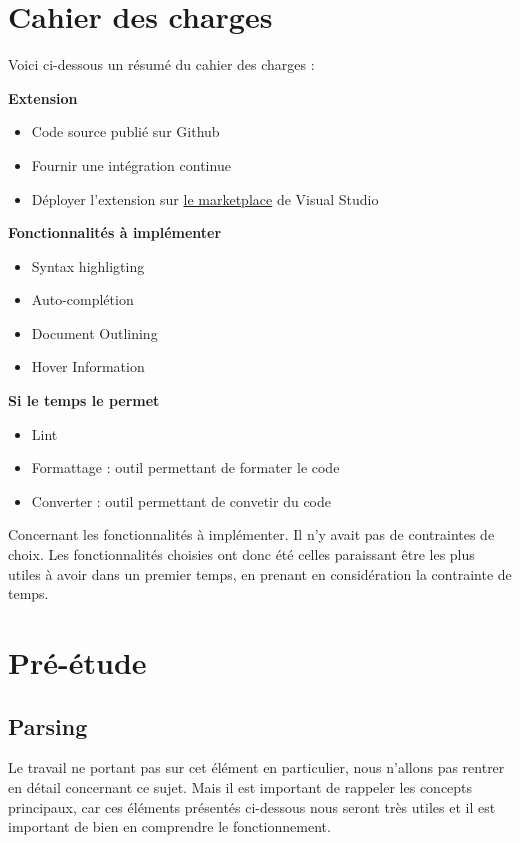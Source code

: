 \documentclass[
    iict, %
    il, %
]{heig-tb}
\begin{document}
\chapter{Cahier des charges}
Voici ci-dessous un résumé du cahier des charges :

\textbf{Extension}
\begin{itemize}
    \item Code source publié sur Github
    \item Fournir une intégration continue
    \item Déployer l'extension sur \href{https://marketplace.visualstudio.com/}{le marketplace} de Visual Studio
\end{itemize}

\textbf{Fonctionnalités à implémenter}
\begin{itemize}
    \item Syntax highligting
    \item Auto-complétion
    \item Document Outlining
    \item Hover Information
\end{itemize}

\textbf{Si le temps le permet}
\begin{itemize}
    \item Lint
    \item Formattage : outil permettant de formater le code
    \item Converter : outil permettant de convetir du code
\end{itemize}

\vspace{\parskip}

Concernant les fonctionnalités à implémenter. Il n'y avait pas de contraintes de choix.
Les fonctionnalités choisies ont donc été celles paraissant être les plus utiles à avoir dans un premier temps, en prenant en considération la contrainte de temps.

\chapter{Pré-étude}

\section{Parsing}
Le travail ne portant pas sur cet élément en particulier, nous n'allons pas rentrer en détail concernant ce sujet.
Mais il est important de rappeler les concepts principaux, car ces éléments présentés ci-dessous nous seront très utiles et il est important de bien en comprendre le fonctionnement.
\end{document}
